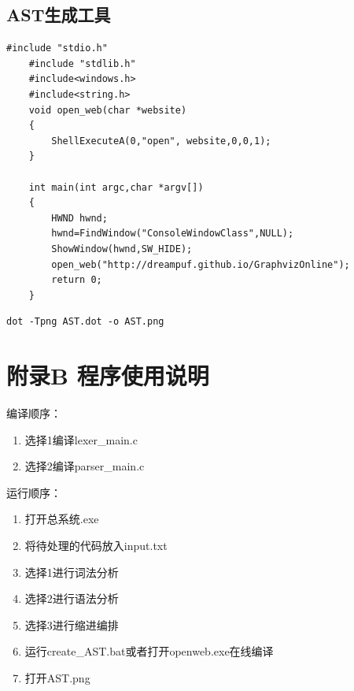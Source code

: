 \documentclass[supercite]{Experimental_Report}
\theoremstyle{definition}
\begin{document}
\subsection{AST生成工具}
\begin{lstlisting}[title=openweb.exe,frame=none]
	#include "stdio.h"  
	#include "stdlib.h" 
	#include<windows.h> 
	#include<string.h>  
	void open_web(char *website)
	{
		ShellExecuteA(0,"open", website,0,0,1);
	}
	
	int main(int argc,char *argv[])   
	{ 
		HWND hwnd;  
		hwnd=FindWindow("ConsoleWindowClass",NULL);    
		ShowWindow(hwnd,SW_HIDE);                      
		open_web("http://dreampuf.github.io/GraphvizOnline");
		return 0;  
	}
\end{lstlisting}

\begin{lstlisting}[title=AST\_creator.bat,frame=none]
dot -Tpng AST.dot -o AST.png
\end{lstlisting}
\newpage
\section{附录B 程序使用说明}
编译顺序：
\begin{enumerate}
	\item 选择1编译lexer\_main.c
	\item 选择2编译parser\_main.c
\end{enumerate}
运行顺序：
\begin{enumerate}
	\item 打开总系统.exe
	\item 将待处理的代码放入input.txt
	\item 选择1进行词法分析
	\item 选择2进行语法分析
	\item 选择3进行缩进编排
	\item 运行create\_AST.bat或者打开openweb.exe在线编译
	\item 打开AST.png
\end{enumerate}
\end{document}
